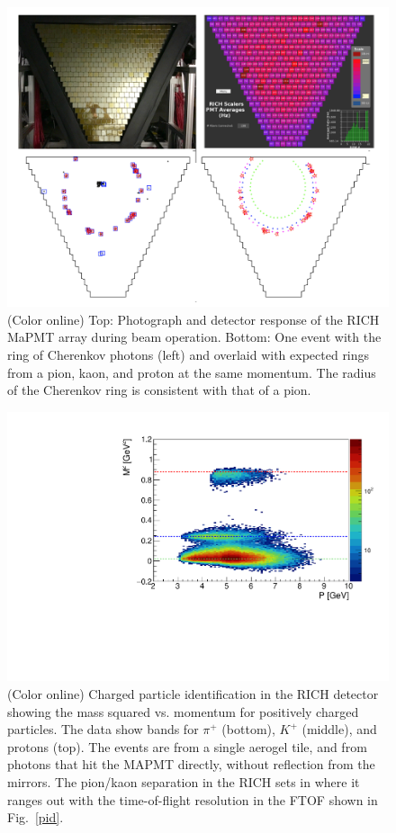 \documentclass[final,3p,twocolumn]{elsarticle}
\begin{document}
\begin{figure}[ht!]
\centerline{\includegraphics[width=1.0\columnwidth]{rich-event.png}}
\caption{(Color online) Top: Photograph and detector response of the RICH MaPMT array during beam operation. Bottom: One
  event with the ring of Cherenkov photons (left) and overlaid with expected rings from a pion, kaon, and proton
  at the same momentum. The radius of the Cherenkov ring is consistent with that of a pion.}
\label{rich-event}
\end{figure}
\begin{figure}[ht!]
\centerline{\includegraphics[width=1.0\columnwidth]{mass_min3.pdf}}
\caption{(Color online) Charged particle identification in the RICH detector showing the mass squared vs. momentum for positively
  charged particles. The data show bands for $\pi^+$ (bottom), $K^+$ (middle), and protons (top). The events are
  from a single aerogel tile, and from photons that hit the MAPMT directly, without reflection from the mirrors. The
  pion/kaon separation in the RICH sets in where it ranges out with the time-of-flight resolution in the FTOF shown
  in Fig.~\ref{pid}.}
\label{rich_rec}
\end{figure}
\end{document}
